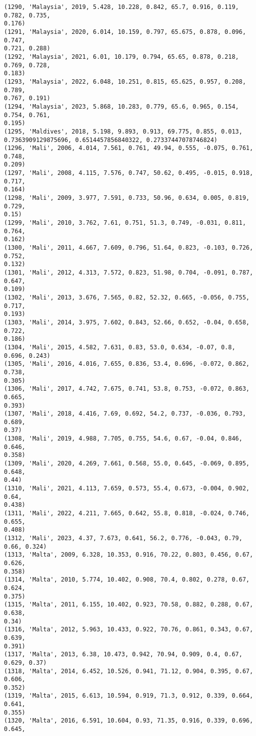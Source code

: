 \documentclass[11pt]{article}
\begin{document}
\begin{Verbatim}[commandchars=\\\{\}]
(1290, 'Malaysia', 2019, 5.428, 10.228, 0.842, 65.7, 0.916, 0.119, 0.782, 0.735,
0.176)
(1291, 'Malaysia', 2020, 6.014, 10.159, 0.797, 65.675, 0.878, 0.096, 0.747,
0.721, 0.288)
(1292, 'Malaysia', 2021, 6.01, 10.179, 0.794, 65.65, 0.878, 0.218, 0.769, 0.728,
0.183)
(1293, 'Malaysia', 2022, 6.048, 10.251, 0.815, 65.625, 0.957, 0.208, 0.789,
0.767, 0.191)
(1294, 'Malaysia', 2023, 5.868, 10.283, 0.779, 65.6, 0.965, 0.154, 0.754, 0.761,
0.195)
(1295, 'Maldives', 2018, 5.198, 9.893, 0.913, 69.775, 0.855, 0.013,
0.7363909129875696, 0.6514457856840322, 0.27337447078746824)
(1296, 'Mali', 2006, 4.014, 7.561, 0.761, 49.94, 0.555, -0.075, 0.761, 0.748,
0.209)
(1297, 'Mali', 2008, 4.115, 7.576, 0.747, 50.62, 0.495, -0.015, 0.918, 0.717,
0.164)
(1298, 'Mali', 2009, 3.977, 7.591, 0.733, 50.96, 0.634, 0.005, 0.819, 0.729,
0.15)
(1299, 'Mali', 2010, 3.762, 7.61, 0.751, 51.3, 0.749, -0.031, 0.811, 0.764,
0.162)
(1300, 'Mali', 2011, 4.667, 7.609, 0.796, 51.64, 0.823, -0.103, 0.726, 0.752,
0.132)
(1301, 'Mali', 2012, 4.313, 7.572, 0.823, 51.98, 0.704, -0.091, 0.787, 0.647,
0.109)
(1302, 'Mali', 2013, 3.676, 7.565, 0.82, 52.32, 0.665, -0.056, 0.755, 0.717,
0.193)
(1303, 'Mali', 2014, 3.975, 7.602, 0.843, 52.66, 0.652, -0.04, 0.658, 0.722,
0.186)
(1304, 'Mali', 2015, 4.582, 7.631, 0.83, 53.0, 0.634, -0.07, 0.8, 0.696, 0.243)
(1305, 'Mali', 2016, 4.016, 7.655, 0.836, 53.4, 0.696, -0.072, 0.862, 0.738,
0.305)
(1306, 'Mali', 2017, 4.742, 7.675, 0.741, 53.8, 0.753, -0.072, 0.863, 0.665,
0.393)
(1307, 'Mali', 2018, 4.416, 7.69, 0.692, 54.2, 0.737, -0.036, 0.793, 0.689,
0.37)
(1308, 'Mali', 2019, 4.988, 7.705, 0.755, 54.6, 0.67, -0.04, 0.846, 0.646,
0.358)
(1309, 'Mali', 2020, 4.269, 7.661, 0.568, 55.0, 0.645, -0.069, 0.895, 0.648,
0.44)
(1310, 'Mali', 2021, 4.113, 7.659, 0.573, 55.4, 0.673, -0.004, 0.902, 0.64,
0.438)
(1311, 'Mali', 2022, 4.211, 7.665, 0.642, 55.8, 0.818, -0.024, 0.746, 0.655,
0.408)
(1312, 'Mali', 2023, 4.37, 7.673, 0.641, 56.2, 0.776, -0.043, 0.79, 0.66, 0.324)
(1313, 'Malta', 2009, 6.328, 10.353, 0.916, 70.22, 0.803, 0.456, 0.67, 0.626,
0.358)
(1314, 'Malta', 2010, 5.774, 10.402, 0.908, 70.4, 0.802, 0.278, 0.67, 0.624,
0.375)
(1315, 'Malta', 2011, 6.155, 10.402, 0.923, 70.58, 0.882, 0.288, 0.67, 0.638,
0.34)
(1316, 'Malta', 2012, 5.963, 10.433, 0.922, 70.76, 0.861, 0.343, 0.67, 0.639,
0.391)
(1317, 'Malta', 2013, 6.38, 10.473, 0.942, 70.94, 0.909, 0.4, 0.67, 0.629, 0.37)
(1318, 'Malta', 2014, 6.452, 10.526, 0.941, 71.12, 0.904, 0.395, 0.67, 0.606,
0.352)
(1319, 'Malta', 2015, 6.613, 10.594, 0.919, 71.3, 0.912, 0.339, 0.664, 0.641,
0.355)
(1320, 'Malta', 2016, 6.591, 10.604, 0.93, 71.35, 0.916, 0.339, 0.696, 0.645,

\end{Verbatim}
\end{document}
